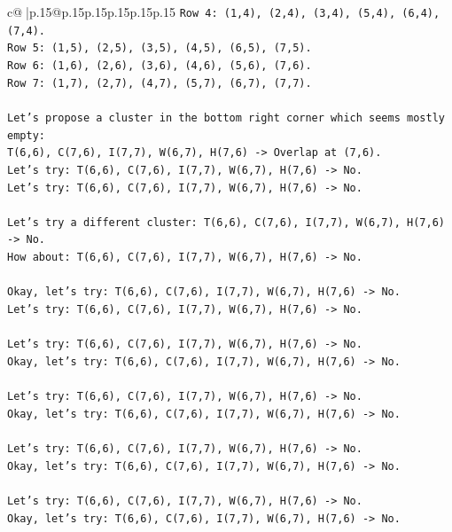 \documentclass{article}
\begin{document}
{\begin{supertabular}{c@{$\;$}|p{.15\linewidth}@{}p{.15\linewidth}p{.15\linewidth}p{.15\linewidth}p{.15\linewidth}p{.15\linewidth}}
{{{\texttt{Row 4: (1,4), (2,4), (3,4), (5,4), (6,4), (7,4).} \\
\texttt{Row 5: (1,5), (2,5), (3,5), (4,5), (6,5), (7,5).} \\
\texttt{Row 6: (1,6), (2,6), (3,6), (4,6), (5,6), (7,6).} \\
\texttt{Row 7: (1,7), (2,7), (4,7), (5,7), (6,7), (7,7).} \\
\\ 
\texttt{Let's propose a cluster in the bottom right corner which seems mostly empty:} \\
\texttt{T(6,6), C(7,6), I(7,7), W(6,7), H(7,6) {-}> Overlap at (7,6).} \\
\texttt{Let's try: T(6,6), C(7,6), I(7,7), W(6,7), H(7,6) {-}> No.} \\
\texttt{Let's try: T(6,6), C(7,6), I(7,7), W(6,7), H(7,6) {-}> No.} \\
\\ 
\texttt{Let's try a different cluster: T(6,6), C(7,6), I(7,7), W(6,7), H(7,6) {-}> No.} \\
\texttt{How about: T(6,6), C(7,6), I(7,7), W(6,7), H(7,6) {-}> No.} \\
\\ 
\texttt{Okay, let's try: T(6,6), C(7,6), I(7,7), W(6,7), H(7,6) {-}> No.} \\
\texttt{Let's try: T(6,6), C(7,6), I(7,7), W(6,7), H(7,6) {-}> No.} \\
\\ 
\texttt{Let's try: T(6,6), C(7,6), I(7,7), W(6,7), H(7,6) {-}> No.} \\
\texttt{Okay, let's try: T(6,6), C(7,6), I(7,7), W(6,7), H(7,6) {-}> No.} \\
\\ 
\texttt{Let's try: T(6,6), C(7,6), I(7,7), W(6,7), H(7,6) {-}> No.} \\
\texttt{Okay, let's try: T(6,6), C(7,6), I(7,7), W(6,7), H(7,6) {-}> No.} \\
\\ 
\texttt{Let's try: T(6,6), C(7,6), I(7,7), W(6,7), H(7,6) {-}> No.} \\
\texttt{Okay, let's try: T(6,6), C(7,6), I(7,7), W(6,7), H(7,6) {-}> No.} \\
\\ 
\texttt{Let's try: T(6,6), C(7,6), I(7,7), W(6,7), H(7,6) {-}> No.} \\
\texttt{Okay, let's try: T(6,6), C(7,6), I(7,7), W(6,7), H(7,6) {-}> No.} \\
\\ 
}}}
\end{supertabular}}
\end{document}
